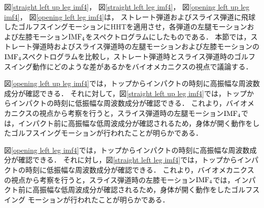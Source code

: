 図\ref{straight left up leg imf4}，
図\ref{straight left leg imf4}，
図\ref{opening left up leg imf4}，
図\ref{opening left leg imf4}は，
ストレート弾道およびスライス弾道に飛球したゴルフスイングモーションにHHTを適用させ，各弾道の左腿モーションおよび左膝モーション${\rm{IMF}}_{4}$をスペクトログラムにしたものである．
本節では，ストレート弾道時およびスライス弾道時の左腿モーションおよび左膝モーションの${\rm{IMF}_{4}}$スペクトログラムを比較し，ストレート弾道時とスライス弾道時のゴルフスイング動作にどのような差があるかをバイオメカニクスの視点で議論する．

図\ref{opening left up leg imf4}では，トップからインパクトの時刻に高振幅な周波数成分が確認できる．
それに対して，図\ref{straight left up leg imf4}では，トップからインパクトの時刻に低振幅な周波数成分が確認できる．
これより，バイオメカニクスの視点から考察を行うと，スライス弾道時の左腿モーション${\rm{IMF}}_{4}$では，インパクト前に高振幅な低周波成分が確認されるため，身体が開く動作をしたゴルフスイングモーションが行われたことが明らかである．

図\ref{opening left leg imf4}では，トップからインパクトの時刻に高振幅な周波数成分が確認できる．
それに対し，図\ref{straight left leg imf4}では，トップからインパクトの時刻に低振幅な周波数成分が確認できる．
これより，バイオメカニクスの視点から考察を行うと，スライス弾道時の左膝モーション${\rm{IMF}}_{4}$では，インパクト前に高振幅な低周波成分が確認されるため，身体が開く動作をしたゴルフスイング
モーションが行われたことが明らかである．
